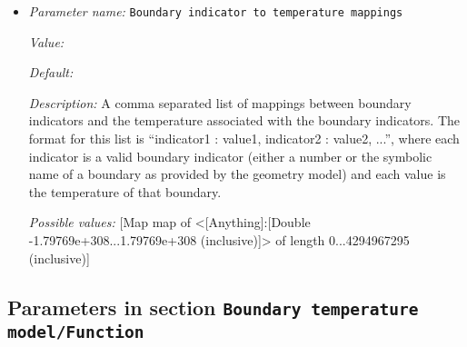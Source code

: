 \begin{itemize}
\item {\it Parameter name:} {\tt Boundary indicator to temperature mappings}
\label{parameters:Boundary temperature model/Constant/Boundary indicator to temperature mappings}


{\it Value:} 


{\it Default:} 


{\it Description:} A comma separated list of mappings between boundary indicators and the temperature associated with the boundary indicators. The format for this list is ``indicator1 : value1, indicator2 : value2, ...'', where each indicator is a valid boundary indicator (either a number or the symbolic name of a boundary as provided by the geometry model) and each value is the temperature of that boundary.


{\it Possible values:} [Map map of <[Anything]:[Double -1.79769e+308...1.79769e+308 (inclusive)]> of length 0...4294967295 (inclusive)]
\end{itemize}

\subsection{Parameters in section \tt Boundary temperature model/Function}
\label{parameters:Boundary_20temperature_20model/Function}

